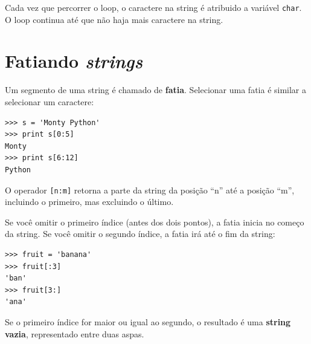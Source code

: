 {Cada vez que percorrer o loop, o caractere na string é atribuido a variável
{\tt char}. O loop continua até que não haja mais caractere na string.


\section{Fatiando {\it strings}}
\label{fatia}



Um segmento de uma string é chamado de {\bf fatia}. Selecionar uma fatia
é similar a selecionar um caractere:

\beforeverb
\begin{verbatim}
>>> s = 'Monty Python'
>>> print s[0:5]
Monty
>>> print s[6:12]
Python
\end{verbatim}
\afterverb
%
%
O operador {\tt[n:m]} retorna a parte da string da posição ``n'' até a
posição ``m'', incluindo o primeiro, mas excluindo o último.


Se você omitir o primeiro índice (antes dos dois pontos), a fatia inicia no
começo da string. Se você omitir o segundo índice, a fatia irá até o fim da
string:

\beforeverb
\begin{verbatim}
>>> fruit = 'banana'
>>> fruit[:3]
'ban'
>>> fruit[3:]
'ana'
\end{verbatim}
\afterverb
%

Se o primeiro índice for maior ou igual ao segundo, o resultado é uma
{\bf string vazia}, representado entre duas aspas.

}
